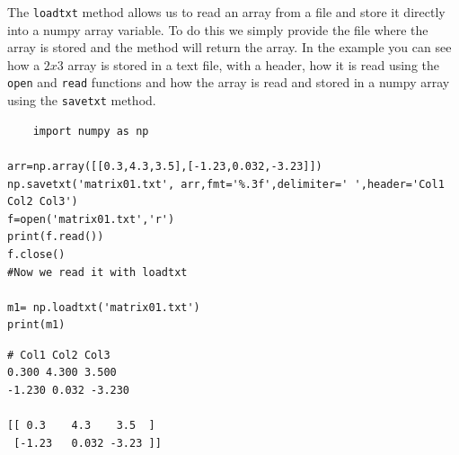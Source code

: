 \begin{paracol}{2}
 \switchcolumn

 The \texttt{loadtxt} method allows us to read an array from a file and store it directly into a numpy array variable. To do this we simply provide the file where the array is stored and the method will return the array. In the example you can see how a $2x3$ array is stored in a text file, with a header, how it is read using the \texttt{open} and \texttt{read} functions and how the array is read and stored in a numpy array using the \texttt{savetxt} method.
 
\end{paracol}
\begin{verbatim}
    import numpy as np

arr=np.array([[0.3,4.3,3.5],[-1.23,0.032,-3.23]])
np.savetxt('matrix01.txt', arr,fmt='%.3f',delimiter=' ',header='Col1 Col2 Col3')
f=open('matrix01.txt','r')
print(f.read())
f.close()
#Now we read it with loadtxt

m1= np.loadtxt('matrix01.txt')
print(m1)

\end{verbatim}

\begin{verbatim}
# Col1 Col2 Col3
0.300 4.300 3.500
-1.230 0.032 -3.230

[[ 0.3    4.3    3.5  ]
 [-1.23   0.032 -3.23 ]]
\end{verbatim}

